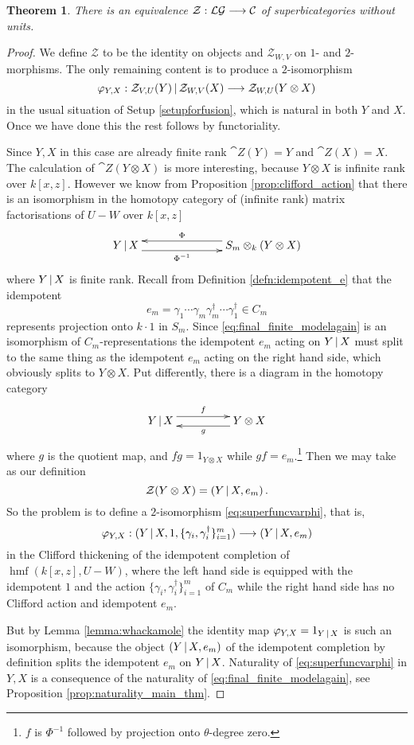 \documentclass[english,letter paper,12pt,leqno]{article}
\newtheorem{theorem}{Theorem}[section]
\theoremstyle{example}
\numberwithin{equation}{section}
\def\LG{\mathcal{LG}}
\def\be{\begin{equation}}
\def\ee{\end{equation}}
\def\L{\mathcal{C}}
\def\ferm{\gamma}
\def\fermc{\gamma^\dagger}
\DeclareMathOperator{\hmf}{hmf}
\begin{document}
\begin{theorem} There is an equivalence $\cat{Z}: \LG \lto \L$ of superbicategories without units.
\end{theorem}
\begin{proof}
We define $\mathcal{Z}$ to be the identity on objects and $\mathcal{Z}_{W,V}$ on $1$- and $2$-morphisms. The only remaining content is to produce a $2$-isomorphism
\be\label{eq:superfuncvarphi}
\varphi_{Y,X}: \cat{Z}_{V,U}(Y) \l \cat{Z}_{W,V}(X) \lto \cat{Z}_{W,U}( Y \otimes X )
\ee
in the usual situation of Setup \ref{setupforfusion}, which is natural in both $Y$ and $X$. Once we have done this the rest follows by functoriality.

Since $Y,X$ in this case are already finite rank $\cat{Z}(Y) = Y$ and $\cat{Z}(X) = X$.  The calculation of $\cat{Z}( Y \otimes X )$ is more interesting, because $Y \otimes X$ is infinite rank over $k[x,z]$. However we know from Proposition \ref{prop:clifford_action} that there is an isomorphism in the homotopy category of (infinite rank) matrix factorisations of $U - W$ over $k[x,z]$
\begin{equation}\label{eq:final_finite_modelagain}
\xymatrix@C+4pc{
Y \l X \ar@<-1ex>[r]_-{\Phi^{-1}} & S_m \otimes_k ( Y \otimes X )\ar@<-1ex>[l]_-{\Phi}
}
\end{equation}
where $Y \,|\, X$ is finite rank. Recall from Definition \ref{defn:idempotent_e} that the idempotent
\[
e_m = \ferm_1 \cdots \ferm_m \fermc_m \cdots \fermc_1 \in C_m
\]
represents projection onto $k \cdot 1$ in $S_m$. Since \eqref{eq:final_finite_modelagain} is an isomorphism of $C_m$-representations the idempotent $e_m$ acting on $Y \,|\, X$ must split to the same thing as the idempotent $e_m$ acting on the right hand side, which obviously splits to $Y \otimes X$. Put differently, there is a diagram in the homotopy category
\[
\xymatrix@C+2pc{
Y \l X \ar@<1ex>[r]^-{f} & Y \otimes X \ar@<1ex>[l]^-{g}
}
\]
where $g$ is the quotient map, and $f g = 1_{Y \otimes X}$ while $g f = e_m$.\footnote{$f$ is $\Phi^{-1}$ followed by projection onto $\theta$-degree zero.} Then we may take as our definition
\[
\mathcal{Z}( Y \otimes X ) = (Y \,|\, X, e_m)\,.
\]
So the problem is to define a $2$-isomorphism \eqref{eq:superfuncvarphi}, that is,
\[
\varphi_{Y,X}: (Y \l X, 1, \{ \ferm_i, \fermc_i \}_{i=1}^m) \lto (Y \l X, e_m)
\]
in the Clifford thickening of the idempotent completion of $\hmf(k[x,z],U - W)$, where the left hand side is equipped with the idempotent $1$ and the action $\{ \ferm_i, \fermc_i \}_{i=1}^m$ of $C_m$ while the right hand side has no Clifford action and idempotent $e_m$.

But by Lemma \ref{lemma:whackamole} the identity map $\varphi_{Y,X} = 1_{Y \,|\, X}$ is such an isomorphism, because the object $(Y \,|\, X, e_m)$ of the idempotent completion by definition splits the idempotent $e_m$ on $Y \,|\, X$. Naturality of \eqref{eq:superfuncvarphi} in $Y,X$ is a consequence of the naturality of \eqref{eq:final_finite_modelagain}, see Proposition \ref{prop:naturality_main_thm}.
\end{proof}
\end{document}
